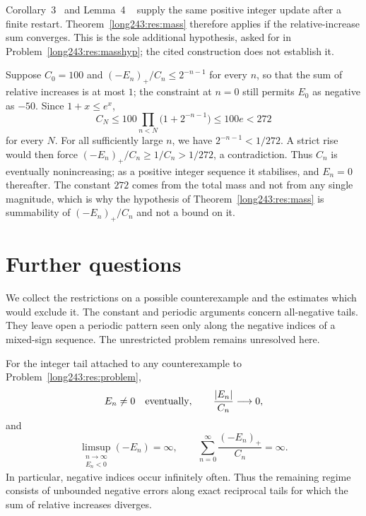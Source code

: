 Corollary~3~\cite[p.~9]{koizumi2025} and Lemma~4
~\cite[pp.~11--12]{koizumi2025} supply the same positive integer update
after a finite restart. Theorem~\ref{long243:res:mass} therefore applies
if the relative-increase sum converges. This is the sole additional
hypothesis, asked for in Problem~\ref{long243:res:masshyp}; the cited
construction does not establish it.

\begin{example}\label{long243:ex:mass}
Suppose $C_0=100$ and $(-E_n)_+/C_n\le2^{-n-1}$ for every $n$, so that the
sum of relative increases is at most $1$; the constraint at $n=0$ still permits
$E_0$ as negative as $-50$.  Since $1+x\le e^{x}$,
\[
 C_N\le100\prod_{n<N}\bigl(1+2^{-n-1}\bigr)\le100e<272
\]
for every $N$. For all sufficiently large $n$, we have
$2^{-n-1}<1/272$. A strict rise would then force
$(-E_n)_+/C_n\ge1/C_n>1/272$, a contradiction. Thus $C_n$ is eventually
nonincreasing; as a positive integer sequence it stabilises, and $E_n=0$
thereafter. The constant $272$ comes from the total mass and not from any single magnitude,
which is why the hypothesis of Theorem~\ref{long243:res:mass} is summability of
$(-E_n)_+/C_n$ and not a bound on it.
\end{example}

\section{Further questions}\label{long243:sec:open}

We collect the restrictions on a possible counterexample and the
estimates which would exclude it. The constant and periodic arguments
concern all-negative tails. They leave open a periodic pattern seen
only along the negative indices of a mixed-sign sequence. The
unrestricted problem remains unresolved here.

\begin{proposition}\label{long243:res:frontier}
For the integer tail attached to any counterexample to
Problem~\ref{long243:res:problem},
\[
 E_n\ne0\quad\hbox{eventually},\qquad
 \frac{|E_n|}{C_n}\longrightarrow0,
\]
and
\[
 \limsup_{\substack{n\to\infty\\E_n<0}}(-E_n)=\infty,
 \qquad
 \sum_{n=0}^{\infty}\frac{(-E_n)_+}{C_n}=\infty .
\]
In particular, negative indices occur infinitely often.  Thus the remaining
regime consists of unbounded negative errors along exact reciprocal tails for which
the sum of relative increases diverges.
\end{proposition}

